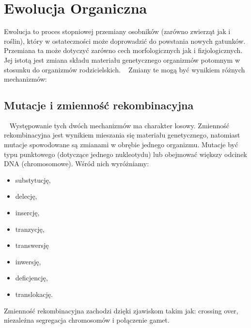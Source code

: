 \documentclass[twoside,a4paper,10]{book}
\begin{document}
  \section{Ewolucja Organiczna}
    Ewolucja to  proces stopniowej przemiany osobników (zarówno zwierząt jak i roślin), który w ostateczności może doprowadzić do powstania nowych gatunków. Przemiana ta może dotyczyć zarówno cech morfologicznych jak i fizjologicznych. Jej istotą jest zmiana składu materiału genetycznego organizmów potomnym w stosunku do organizmów rodzicielskich. ~\cite{encyk}  
Zmiany te mogą być wynikiem różnych mechanizmów:
             \subsection{  Mutacje i zmienność rekombinacyjna }~\label{sec:mutate}
Występowanie tych dwóch mechanizmów ma charakter losowy. Zmienność rekombinacyjna jest wynikiem mieszania się materiału genetycznego, natomiast mutacje spowodowane są zmianami w obrębie jednego organizmu.
    Mutacje być typu punktowego (dotyczące  jednego nukleotydu) lub obejmować większy odcinek DNA (chromosomowe). Wśród nich wyróżniamy:
\begin{itemize}
\item{substytucję, }
\item{delecję,}
\item{insercję,}
\item{tranzycję,}
\item{transwersję}
\item{inwersję, }
\item{deficjencję,}
\item{translokację. ~\cite{berkely}}
\end{itemize}

    Zmienność rekombinacyjna zachodzi dzięki zjawiskom takim jak: crossing over, niezależna segregacja chromosomów i połączenie gamet.
\end{document}
